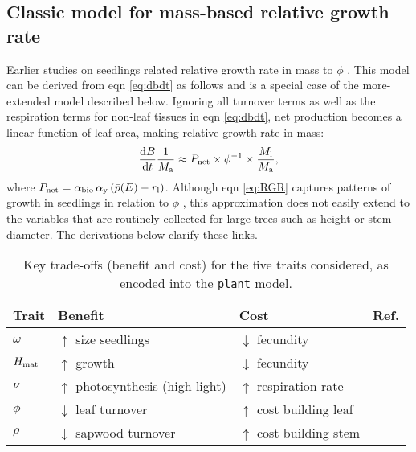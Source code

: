 \documentclass[9pt,twocolumn,twoside]{pnas-new}
\newcommand{\plant}{\texttt{plant}}
\begin{document}
\subsection{Classic model for mass-based relative growth rate}

Earlier studies on seedlings related relative growth rate in mass to $\phi$ \citep{Blackman-1919, Lambers-1992, Cornelissen-1996, Wright-2000}. This model can be derived from eqn \ref{eq:dbdt} as follows and is a special case of the more-extended model described below. Ignoring all turnover terms as well as the respiration terms for non-leaf tissues in eqn \ref{eq:dbdt}, net production becomes a linear function of leaf area, making relative growth rate in mass:
\begin{equation}\label{eq:RGR}
\frac{{\rm d}B}{{\rm d}t}\frac{1}{M_{\rm a}}  \approx P_{\rm net} \times \phi^{-1} \times \frac{M_{\rm l}}{M_{\rm a}}, \end{equation}
where $P_{\rm net} = \alpha_{\rm bio} \, \alpha_{\rm y}\,(\bar{p}(E) - r_{\rm l})$. Although eqn \ref{eq:RGR} captures patterns of growth in seedlings in relation to $\phi$ \citep{Wright-2000}, this approximation does not easily extend to the variables that are routinely collected for large trees such as height or stem diameter. The derivations below clarify these links.

\begin{table}[t]
 \caption{Key trade-offs (benefit and cost) for the five traits considered, as encoded into the {\plant} model.
 }
\centering
  \begin{tabular}{p{0.5cm}p{3.25cm}p{2.25cm}p{1cm}}
  \toprule
  Trait &  Benefit & Cost & Ref. \\
  \midrule
  $\omega$ & $\uparrow$ size seedlings & $\downarrow$ fecundity & \citep{Moles-2006}\\
  $H_{{\rm mat}}$  & $\uparrow$ growth & $\downarrow$ fecundity & \citep{Thomas-2011, Wenk-2015}\\
  $\nu$ & $\uparrow$ photosynthesis (high light) & $\uparrow$ respiration rate & \citep{Wright-2004}\\
  $\phi$ & $\downarrow$ leaf turnover & $\uparrow$ cost building leaf & \citep{Wright-2004}\\
  $\rho$ & $\downarrow$ sapwood turnover & $\uparrow$ cost building stem & \citep{Chave-2009}\\
  \bottomrule
  \end{tabular}
\label{tab:traits}
\end{table}
\end{document}

